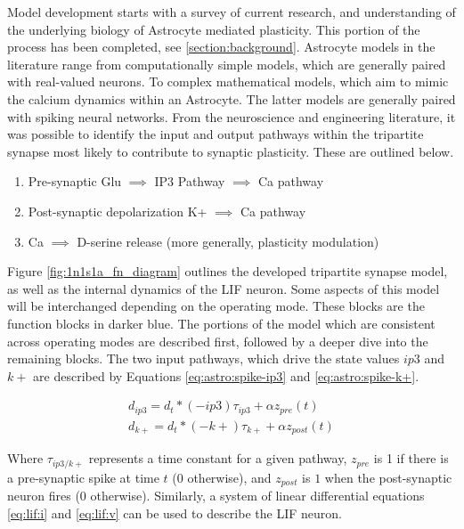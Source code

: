     Model development starts with a survey of current research, and
    understanding of the underlying biology of Astrocyte mediated
    plasticity. This portion of the process has been completed, see
    \ref{section:background}. Astrocyte models in the literature range from
    computationally simple models, which are generally paired with real-valued
    neurons. To complex mathematical models, which aim to mimic the calcium
    dynamics within an Astrocyte. The latter models are generally paired with
    spiking neural networks. From the neuroscience and engineering literature,
    it was possible to identify the input and output pathways within the
    tripartite synapse most likely to contribute to synaptic plasticity. These
    are outlined below.

    \begin{enumerate}
        \item Pre-synaptic Glu $\implies$ IP3 Pathway $\implies$ Ca pathway
        \item Post-synaptic depolarization K+ $\implies$ Ca pathway
        \item Ca $\implies$ D-serine release (more generally, plasticity modulation)
    \end{enumerate}


    Figure \ref{fig:1n1s1a_fn_diagram} outlines the developed tripartite synapse
    model, as well as the internal dynamics of the LIF neuron. Some aspects of
    this model will be interchanged depending on the operating mode. These
    blocks are the function blocks in darker blue. The portions of the model
    which are consistent across operating modes are described first, followed by
    a deeper dive into the remaining blocks. The two input pathways, which drive
    the state values $ip3$ and $k+$ are described by Equations
    \ref{eq:astro:spike-ip3} and \ref{eq:astro:spike-k+}.

    \begin{align}
      d_{ip3} = d_t * (-ip3)\tau_{ip3} + \alpha z_{pre}(t) \label{eq:astro:spike-ip3} \\
      d_{k+} = d_t * (-k+)\tau_{k+} + \alpha z_{post}(t) \label{eq:astro:spike-k+}
    \end{align}

    Where $\tau_{ip3/k+}$ represents a time constant for a given pathway, $z_{pre}$ is
    1 if there is a pre-synaptic spike at time $t$ ($0$ otherwise), and
    $z_{post}$ is $1$ when the post-synaptic neuron fires ($0$
    otherwise). Similarly, a system of linear differential equations 
    \ref{eq:lif:i} and \ref{eq:lif:v} can be used to describe the LIF neuron.
    
